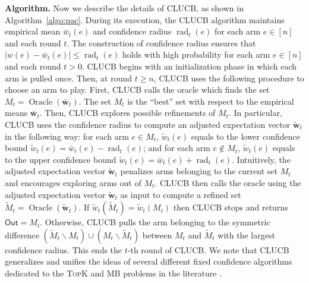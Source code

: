 \documentclass{article}
\newcommand{\wei}[1]{}
\newcommand{\wei}[1]{{\color{blue!50!black}  [\text{Wei:} #1]}}
\newcommand{\Algorithm}{{\small \textsf{CLUCB}}\xspace}
\newcommand{\del}{\backslash}
\DeclareMathOperator{\rad}{rad}
\DeclareMathOperator{\Oracle}{Oracle}
\newcommand{\out}{\mathsf{Out}}
\newcommand{\MultiIdent}{\textsc{TopK}\xspace}
\newcommand{\MultiBandit}{\textsc{MB}\xspace}
\renewcommand{\vec}[1]{\boldsymbol{#1}}
\begin{document}
\textbf{Algorithm.} 
Now we describe the details of \Algorithm, as shown in Algorithm~\ref{algo:pac}.
%
During its execution, the \Algorithm algorithm maintains empirical mean $\bar w_t(e)$ and confidence radius $\rad_t(e)$ for each arm $e\in[n]$ and each round $t$.
The construction of confidence radius ensures that $|w(e)-\bar w_t(e)| \le \rad_t(e)$ holds with high probability for each arm $e \in [n]$ and each round $t>0$.
\Algorithm begins with an initialization phase in which each arm is pulled once.
Then, at round $t \ge n$, \Algorithm uses the following procedure to choose an arm to play. 
First, \Algorithm calls the oracle which finds the set $M_t=\Oracle(\vec {\bar w}_t)$. 
The set $M_t$ is the ``best'' set with respect to the empirical means $\vec {\bar w}_t$.
Then, \Algorithm explores possible refinements of $M_t$. 
In particular, \Algorithm uses the confidence radius to compute an adjusted expectation vector $\vec {\tilde w}_t$ in the following way: for each arm $e \in M_t$, $\tilde w_t(e)$ equals to the lower confidence bound $\tilde w_t(e) = \bar w_t(e)-\rad_t(e)$; and for each arm $e\not\in M_t$, $\tilde w_t(e)$ equals to the upper confidence bound $\tilde w_t(e)=\bar w_t(e)+\rad_t(e)$.
Intuitively, the adjusted expectation vector $\vec {\tilde w}_t$ penalizes arms belonging to the current set $M_t$ and encourages exploring arms out of $M_t$.
\Algorithm then calls the oracle using the adjusted expectation vector $\vec {\tilde w}_t$ as input to compute a refined set $\tilde M_t = \Oracle(\vec {\tilde w}_t)$.
If $\tilde w_t(\tilde M_t) = \tilde w_t(M_t)$ then \Algorithm stops and returns $\out=M_t$.
Otherwise, \Algorithm pulls the arm belonging to the symmetric difference $(\tilde M_t \del M_t) \cup (M_t \del \tilde M_t)$ between $M_t$ and $\tilde M_t$ with the largest confidence radius.
This ends the $t$-th round of \Algorithm.
We note that \Algorithm generalizes and unifies the ideas of several different fixed confidence algorithms dedicated to the \MultiIdent and \MultiBandit problems in the literature \citep{kalyanakrishnan2012pac,gabillon2012best,kaufmann2013information}.
\end{document}
